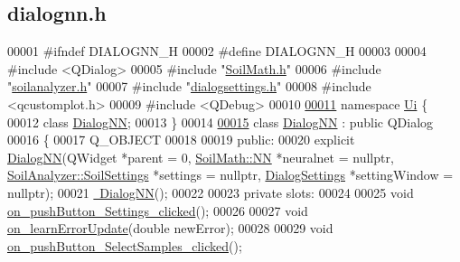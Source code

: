 \hypertarget{dialognn_8h_source}{}\subsection{dialognn.\+h}
\label{dialognn_8h_source}

\begin{DoxyCode}
00001 \textcolor{preprocessor}{#ifndef DIALOGNN\_H}
00002 \textcolor{preprocessor}{#define DIALOGNN\_H}
00003 
00004 \textcolor{preprocessor}{#include <QDialog>}
00005 \textcolor{preprocessor}{#include "\hyperlink{_soil_math_8h}{SoilMath.h}"}
00006 \textcolor{preprocessor}{#include "\hyperlink{soilanalyzer_8h}{soilanalyzer.h}"}
00007 \textcolor{preprocessor}{#include "\hyperlink{dialogsettings_8h}{dialogsettings.h}"}
00008 \textcolor{preprocessor}{#include <qcustomplot.h>}
00009 \textcolor{preprocessor}{#include <QDebug>}
00010 
\hypertarget{dialognn_8h_source_l00011}{}\hyperlink{namespace_ui}{00011} \textcolor{keyword}{namespace }\hyperlink{namespace_ui}{Ui} \{
00012   \textcolor{keyword}{class }\hyperlink{class_dialog_n_n}{DialogNN};
00013 \}
00014 
\hypertarget{dialognn_8h_source_l00015}{}\hyperlink{class_dialog_n_n}{00015} \textcolor{keyword}{class }\hyperlink{class_dialog_n_n}{DialogNN} : \textcolor{keyword}{public} QDialog
00016 \{
00017   Q\_OBJECT
00018 
00019 \textcolor{keyword}{public}:
00020   \textcolor{keyword}{explicit} \hyperlink{class_dialog_n_n_a53065cfe16eeaf3cf1b1e94058738c3f}{DialogNN}(QWidget *parent = 0, \hyperlink{class_soil_math_1_1_n_n}{SoilMath::NN} *neuralnet = \textcolor{keyword}{nullptr}, 
      \hyperlink{class_soil_analyzer_1_1_soil_settings}{SoilAnalyzer::SoilSettings} *settings = \textcolor{keyword}{nullptr}, 
      \hyperlink{class_dialog_settings}{DialogSettings} *settingWindow = \textcolor{keyword}{nullptr});
00021   \hyperlink{class_dialog_n_n_a128ab0c8ba3e7a140545eb2dd37f4aab}{~DialogNN}();
00022 
00023 \textcolor{keyword}{private} slots:
00024 
00025   \textcolor{keywordtype}{void} \hyperlink{class_dialog_n_n_a4a203b679f42761eae157b445bcfc57d}{on\_pushButton\_Settings\_clicked}();
00026 
00027   \textcolor{keywordtype}{void} \hyperlink{class_dialog_n_n_a24e8d08c95de8dd392e81409b9500ab6}{on\_learnErrorUpdate}(\textcolor{keywordtype}{double} newError);
00028 
00029   \textcolor{keywordtype}{void} \hyperlink{class_dialog_n_n_a7394140277f980979c9285fa88bee382}{on\_pushButton\_SelectSamples\_clicked}();

\end{DoxyCode}

